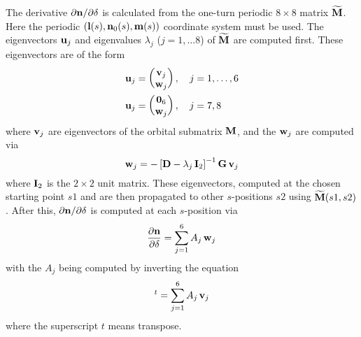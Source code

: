 {The derivative ${\partial{\bf n}}/\partial\delta$ is calculated from the one-turn periodic $8 \times 8$
matrix $\widetilde {{\bf M}}$\cite{b:barber99}. Here the periodic $({\bf l}(s), {\bf n}_0(s),
{\bf m}(s))$ coordinate system must be used.  The eigenvectors ${\bf u}_j$ and eigenvalues $\lambda_j$
($j = 1, \ldots 8$) of $\widetilde {{\bf M}}$ are computed first. These eigenvectors are of the form
\begin{align}
  {\bf u}_j &= \begin{pmatrix} {\bf v}_j \\ {\bf w}_j \end{pmatrix}, \quad j = 1, \ldots, 6 
  \label{qvw} \\
  {\bf u}_j &= \begin{pmatrix} {\bf 0}_6 \\ {\bf w}_j \end{pmatrix}, \quad j = 7, 8 \nonumber
\end{align}
where ${\bf v}_j$ are eigenvectors of the orbital submatrix ${\bf M}$, and the ${\bf w}_j$ are computed via
\begin{equation}
  {\bf w}_j = -\left[ {\bf D} - \lambda_j \, {\bf I}_2 \right]^{-1} {\bf G} \, {\bf v}_j
  \label{wdlgv}
\end{equation}
where ${\bf I}_2$ is the $2 \times 2$ unit matrix. These eigenvectors, computed at the chosen starting
point $s1$ and are then propagated to other $s$-positions $s2$ using ${\widetilde {{\bf M}}}(s1,
s2)$. After this, ${\partial {\bf n}}/\partial \delta$ is computed at each $s$-position via
\begin{equation}
  \frac{\partial {\bf n}}{\partial \delta} = \sum_{j = 1}^6 A_j \, {\bf w}_j
  \label{ndaw}
\end{equation}
with the $A_j$ being computed by inverting the equation
\begin{equation}
  [0, 0, 0, 0, 0, 1]^t = \sum_{j = 1}^6 A_j \, \bfv_j
  \label{000001}
\end{equation}
where the superscript $t$ means transpose.

}
